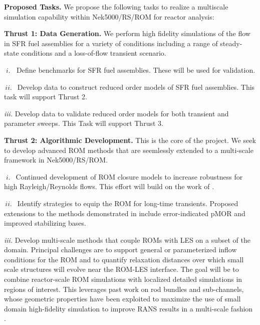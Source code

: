 \noindent

\vspace{-.1in}
{\bf Proposed Tasks.}
We propose the following tasks to realize a multiscale simulation
capability within Nek5000/RS/ROM for reactor analysis:

\textbf{Thrust 1: Data Generation.} We perform high fidelity simulations of the
flow in SFR fuel assemblies for a variety of conditions including a range of
steady-state conditions and a loss-of-flow transient scenario.
\\[-4ex]
\begin{description}
\item{$\; i.\; \;$}
Define benchmarks for SFR fuel assemblies. These will be used for validation.
\\[-4ex]
\item{$\, ii. \,\;$}
Develop data to construct reduced order models of SFR fuel assemblies. This
task will support Thrust 2.  
\\[-4ex]
\item{\em iii.} Develop data to validate reduced order models for both
transient and parameter sweeps. This Task will support Thrust 3.
\\[-4ex]
\end{description}

\textbf{Thrust 2: Algorithmic Development.} This is the core of the project.
We seek to develop advanced ROM methods that are seemlessly
extended to a multi-scale framework in Nek5000/RS/ROM.
\\[-5ex]
\begin{description}
\item{$\; i.\, \;$}
Continued development of ROM closure models to increase robustness 
for high Rayleigh/Reynolds flows.  This effort will build on the work of
\cite{kaneko22a,kaneko22,tsai22a,kaneko20a}.
\\[-3ex]
\item{$\, ii. \,\;$}
Identify strategies to equip the ROM for long-time transients.  
Proposed extensions to the methods demonstrated in \cite{kaneko20a}
include error-indicated pMOR and improved stabilizing bases.
\\[-3ex]
\item{\em iii.}
Develop multi-scale methods that couple ROMs with LES on a subset of the
domain.  Principal challenges are to support general or parameterized inflow
conditions for the ROM and to quantify relaxation distances over which small
scale structures will evolve near the ROM-LES interface. The goal will be to
combine reactor-scale ROM simulations with localized detailed simulations in
regions of interest. This leverages past work on rod bundles and sub-channels,
whose geometric properties have been exploited to maximize the use of small
domain high-fidelity simulation to improve RANS results in a multi-scale
fashion \cite{martinez2019a}.  
\\[-5ex]
\end{description}%

